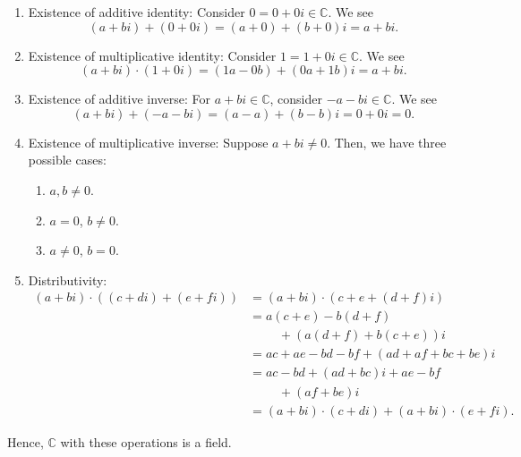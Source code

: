 \begin{sltn}[\ref{exer:cfield}]
\begin{enumerate}
    \item Existence of additive identity: Consider $ 0=0+0i\in\mathbb{C} $. We see
    \begin{equation*}
        (a+bi)+(0+0i)=(a+0)+(b+0)i=a+bi.
    \end{equation*}

    \item Existence of multiplicative identity: Consider $ 1=1+0i\in\mathbb{C} $. We see
    \begin{equation*}
        (a+bi)\cdot(1+0i)=(1a-0b)+(0a+1b)i=a+bi.
    \end{equation*}

    \item Existence of additive inverse: For $ a+bi\in\mathbb{C} $, consider $ -a-bi\in\mathbb{C} $. We see
    \begin{equation*}
        (a+bi)+(-a-bi)=(a-a)+(b-b)i=0+0i=0.
    \end{equation*}

    \item Existence of multiplicative inverse: Suppose $ a+bi\neq 0 $. Then, we have three possible cases:
    \begin{enumerate}
        \item $ a,b\neq 0 $.
        \item $ a=0 $, $ b\neq 0 $.
        \item $ a\neq 0 $, $ b=0 $.
    \end{enumerate}

    \item Distributivity:
    \begin{align*}
        (a+bi)\cdot((c+di)+(e+fi)) &= (a+bi)\cdot(c+e+(d+f)i) \\
        &= a(c+e)-b(d+f) \\
        &\phantom{=}\quad +(a(d+f)+b(c+e))i \\
        &= ac+ae-bd-bf+(ad+af+bc+be)i \\
        &= ac-bd+(ad+bc)i+ae-bf \\
        &\phantom{=}\quad +(af+be)i \\
        &= (a+bi)\cdot(c+di)+(a+bi)\cdot(e+fi).
    \end{align*}
\end{enumerate}
Hence, $ \mathbb{C} $ with these operations is a field.
\end{sltn}